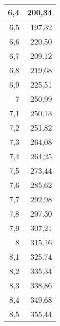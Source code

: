 \documentclass{article}
\begin{document}
\begin{center}
\begin{longtable}{|r|r|}
6,4                                & 200,34                             \\ \hline
6,5                                & 197,32                             \\ \hline
6,6                                & 220,50                              \\ \hline
6,7                                & 209,12                             \\ \hline
6,8                                & 219,68                             \\ \hline
6,9                                & 225,51                             \\ \hline
7                                  & 250,99                             \\ \hline
7,1                                & 250,13                             \\ \hline
7,2                                & 251,82                             \\ \hline
7,3                                & 264,08                             \\ \hline
7,4                                & 264,25                             \\ \hline
7,5                                & 273,44                             \\ \hline
7,6                                & 285,62                             \\ \hline
7,7                                & 292,98                             \\ \hline
7,8                                & 297,30                              \\ \hline
7,9                                & 307,21                             \\ \hline
8                                  & 315,16                             \\ \hline
8,1                                & 325,74                             \\ \hline
8,2                                & 335,34                             \\ \hline
8,3                                & 338,86                             \\ \hline
8,4                                & 349,68                             \\ \hline
8,5                                & 355,44                             \\ \hline

\end{longtable}
\end{center}
\end{document}
